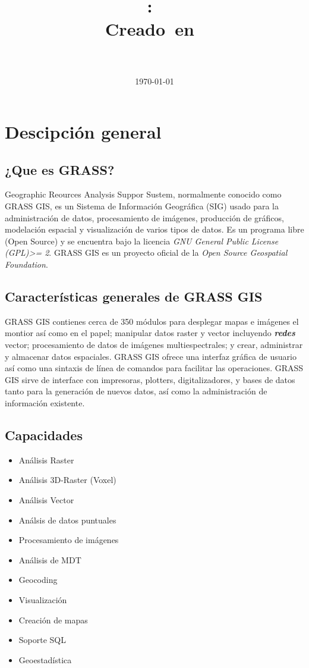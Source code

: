 \documentclass{article}
\title{
\vspace{2in}
\textmd{\textbf{\Curso:\ \Titulo}}\\
\normalsize\vspace{0.1in}\small{Creado\ en\ \Fecha}\\
\vspace{0.1in}\large{\textit{\Autor\ \\ \Profesion}}
\vspace{3in}
}
\author{\textbf{\SIGLA}}
\date{\today} %
\begin{document}
\maketitle
\newpage
\tableofcontents
\newpage
\section{Descipción general}
\subsection{¿Que es GRASS?}
Geographic Reources Analysis Suppor Sustem, normalmente conocido como GRASS GIS, es un Sistema de Información Geográfica (SIG) usado para la administración de datos, procesamiento de imágenes, producción de gráficos, modelación espacial y visualización de varios tipos de datos. Es un programa libre (Open Source) y se encuentra bajo la licencia \textit{GNU General Public License (GPL)>=  2}. GRASS GIS es un proyecto oficial de la \textit{Open Source Geospatial Foundation}.

\subsection{Características generales de GRASS GIS}
GRASS GIS contienes cerca de 350 módulos para desplegar mapas e imágenes el montior así como en el papel; manipular datos raster y vector incluyendo \textbf{\textit{redes}} vector; procesamiento de datos de im\'agenes multiespectrales; y crear, administrar y almacenar datos espaciales. GRASS GIS ofrece una interfaz gráfica de usuario así como una sintaxis de línea de comandos para facilitar las operaciones. GRASS GIS sirve de interface con impresoras, plotters, digitalizadores, y bases de datos tanto para la generación de nuevos datos, así como la administración de información existente.

\subsection{Capacidades}
\begin{itemize}
\item Análisis Raster
\item Análisis 3D-Raster (Voxel)
\item Análisis Vector
\item Análsis de datos puntuales
\item Procesamiento de imágenes
\item Análisis de MDT
\item Geocoding
\item Visualización
\item Creación de mapas
\item Soporte SQL
\item Geoestadística
\end{itemize}
\end{document}
